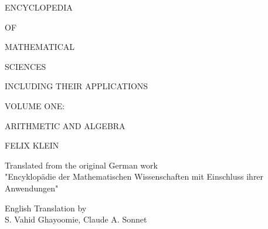 \documentclass{book}
\begin{document}
\begin{center}
\vspace*{1cm}
{\fontsize{36}{42}\selectfont ENCYCLOPEDIA}

\vspace{0.5cm}
{\fontsize{24}{30}\selectfont OF}

\vspace{0.5cm}
{\fontsize{36}{42}\selectfont MATHEMATICAL}

\vspace{0.5cm}
{\fontsize{36}{42}\selectfont SCIENCES}

\vspace{1cm}
{\fontsize{18}{22}\selectfont INCLUDING THEIR APPLICATIONS}

\vspace{2cm}
{\fontsize{20}{26}\selectfont VOLUME ONE:}

\vspace{0.5cm}
{\fontsize{24}{30}\selectfont ARITHMETIC AND ALGEBRA}

\vspace{1.0cm}
{\fontsize{18}{22}\selectfont FELIX KLEIN}

\vspace{0.8cm}
{\fontsize{14}{16}\selectfont Translated from the original German work\\
"Encyklopädie der Mathematischen Wissenschaften mit Einschluss ihrer Anwendungen"}

\vspace{0.8cm}
{\fontsize{14}{20}\selectfont English Translation by\\[0.3cm]
S. Vahid Ghayoomie, Claude A. Sonnet}

\vspace{0.5cm}
{\fontsize{12}{20}}

\end{center}

\cleardoublepage













\end{document}
